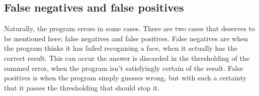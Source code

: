 \subsection{False negatives and false positives}
Naturally, the program errors in some cases. There are two cases that deserves to be mentioned here; false negatives and false positives. False negatives are when the program thinks it has failed recognising a face, when it actually has the correct result. This can occur the answer is discarded in the thresholding of the summed error, when the program isn’t satisfyingly certain of the result. False positives is when the program simply guesses wrong, but with such a certainty that it passes the thresholding that should stop it.
